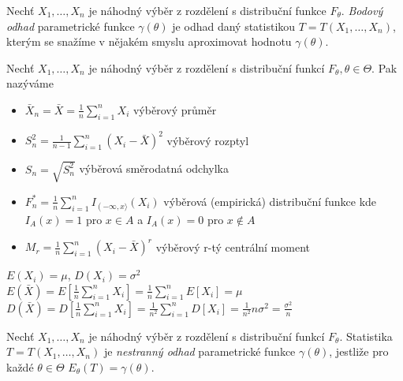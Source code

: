 \begin{definition}
Nechť $X_1,\ldots,X_n$ je náhodný výběr z rozdělení s distribuční funkce $F_{\theta}$. \textit{Bodový odhad} parametrické funkce $\gamma \left(\theta \right)$ je odhad daný statistikou $T=T \left(X_1,\ldots,X_n \right)$, kterým se snažíme v nějakém smyslu aproximovat hodnotu $\gamma \left(\theta \right)$.
\end{definition}

\begin{definition}
Nechť $X_1,\ldots,X_n$ je náhodný výběr z rozdělení s distribuční funkcí $F_{\theta}, \theta \in \Theta$. Pak nazýváme \begin{itemize}
\item $\bar{X}_n = \bar{X} = \frac{1}{n} \sum_{i=1}^{n} X_i$ výběrový průměr
\item $S_{n}^{2} = \frac{1}{n-1}\sum_{i=1}^{n} \left( X_i - \bar{X}\right)^2$ výběrový rozptyl 
\item $S_{n} = \sqrt{S_{n}^{2}}$ výběrová směrodatná odchylka
\item $F_{n}^{*} = \frac{1}{n} \sum_{i=1}^{n} I_{\left( - \infty , x \rangle \right.} \left(X_i \right)$ výběrová (empirická) distribuční funkce kde $I_A \left( x \right) = 1$ pro $x \in A$ a $I_A \left( x \right) = 0$ pro $x \notin A$
\item $M_r = \frac{1}{n} \sum_{i=1}^{n} \left( X_i - \bar{X}\right)^r$ výběrový r-tý centrální moment
\end{itemize}
\end{definition}

\begin{notes}
$E \left(X_i \right) = \mu$, $D \left(X_i \right) = \sigma^2 $\\
$E \left(\bar{X} \right) = E \left[\frac{1}{n} \sum_{i=1}^{n} X_i \right] = \frac{1}{n} \sum_{i=1}^{n} E\left[ X_i \right] = \mu$\\
$D \left(\bar{X} \right) = D \left[\frac{1}{n} \sum_{i=1}^{n} X_i \right] = \frac{1}{n^2} \sum_{i=1}^{n} D\left[ X_i \right] = \frac{1}{n^2} n \sigma^2 = \frac{\sigma^2}{n}$
\end{notes}

\begin{definition}
Nechť $X_1,\ldots,X_n$ je náhodný výběr z rozdělení s distribuční funkcí $F_{\theta}$. Statistika $T=T \left(X_1,\ldots,X_n \right)$ je \textit{nestranný odhad} parametrické funkce $\gamma \left(\theta \right)$, jestliže pro každé $\theta \in \Theta$ $E_{\theta} \left(T \right) = \gamma \left(\theta \right)$.
\end{definition}

